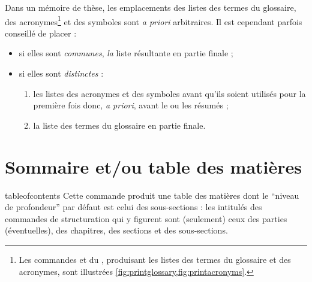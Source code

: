 Dans un mémoire de thèse, les emplacements des listes des termes du glossaire,
des acronymes\footnote{Les commandes  et
   du , produisant les listes
  des termes du glossaire et des acronymes, sont illustrées
  \vref{fig:printglossary,fig:printacronyms}.} et des symboles sont \emph{a
  priori} arbitraires. Il est cependant parfois conseillé de placer :
  \begin{itemize}
  \item si elles sont \emph{communes}, \emph{la} liste résultante en partie finale ;
  \item si elles sont \emph{distinctes} :
    \begin{enumerate}
    \item les listes des acronymes et des symboles avant qu'ils soient utilisés
      pour la première fois donc, \emph{a priori}, avant le ou les résumés ;
    \item la liste des termes du glossaire en partie finale.
    \end{enumerate}
  \end{itemize}

  \section{Sommaire et/ou table des matières}\label{sec:table-des-matieres}

\begin{docCommand}[doc description=\mandatory]{tableofcontents}{}
  Cette commande produit une table des matières dont le \enquote{niveau de
    profondeur} par défaut est celui des sous-sections : les intitulés des
  commandes de structuration qui y figurent sont (seulement) ceux des parties
  (éventuelles), des chapitres, des sections et des sous-sections.
\end{docCommand}



